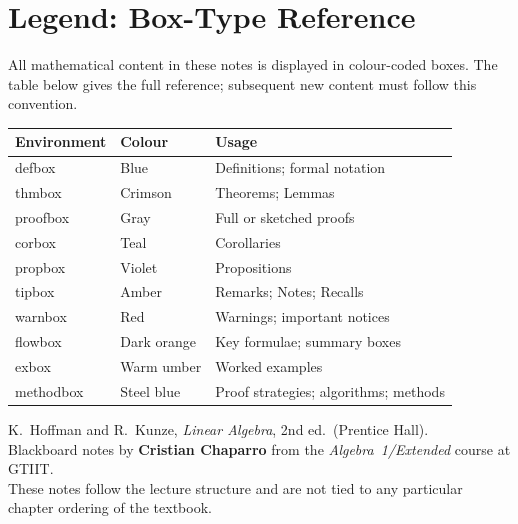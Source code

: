 \newpage
\section*{Legend: Box-Type Reference}

All mathematical content in these notes is displayed in colour-coded boxes.
The table below gives the full reference; subsequent new content must follow
this convention.

\begin{center}
\renewcommand{\arraystretch}{1.35}
\begin{tabular}{>{\ttfamily}l l p{7.5cm}}
\toprule
\textrm{\textbf{Environment}} & \textbf{Colour} & \textbf{Usage} \\
\midrule
defbox    & \textcolor{defblue}{Blue}                 & Definitions; formal notation \\
thmbox    & \textcolor{thmcrimson}{Crimson}           & Theorems; Lemmas \\
proofbox  & \textcolor{proofgray}{Gray}               & Full or sketched proofs \\
corbox    & \textcolor{corteal}{Teal}                 & Corollaries \\
propbox   & \textcolor{propviolet}{Violet}            & Propositions \\
tipbox    & \textcolor{tipamber}{Amber}               & Remarks; Notes; Recalls \\
warnbox   & \textcolor{warnred}{Red}                  & Warnings; important notices \\
flowbox   & \textcolor{orange!65!black}{Dark orange}  & Key formulae; summary boxes \\
exbox     & \textcolor{orange!40!brown}{Warm umber}   & Worked examples \\
methodbox & \textcolor{methodsteel}{Steel blue}       & Proof strategies; algorithms; methods \\
\bottomrule
\end{tabular}
\end{center}

\begin{tipbox}
K.\ Hoffman and R.\ Kunze, \textit{Linear Algebra}, 2nd ed.\ (Prentice Hall).\\
Blackboard notes by \textbf{Cristian Chaparro} from the \textit{Algebra~1/Extended} course at GTIIT.\\
These notes follow the lecture structure and are not tied to any particular chapter ordering of the textbook.
\end{tipbox}

